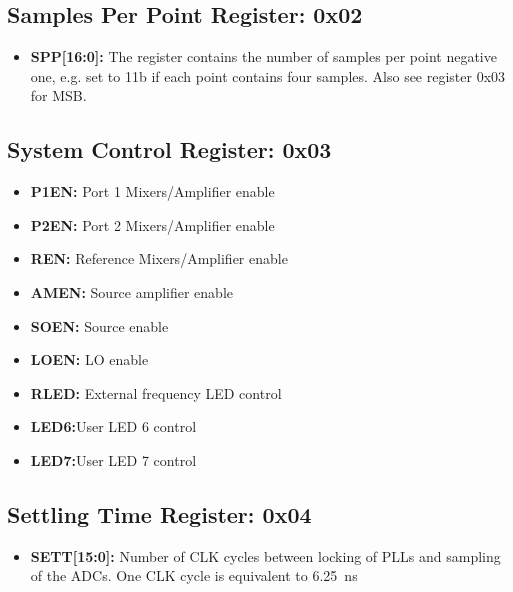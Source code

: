 \documentclass{article}
\newcommand{\bitrect}[2]{
  \begin{pgfonlayer}{foreground}
    \draw [thick] (0,0) rectangle (#1,1);
    \pgfmathsetmacro\result{#1-1}
    \foreach \x in {1,...,\result}
      \draw [thick] (\x,1) -- (\x, 0.8);
  \end{pgfonlayer}
  \bitlabels{#1}{#2}
}
\newcommand{\rwbits}[3]{
  \draw [thick] (#1,0) rectangle ++(#2,1) node[pos=0.5]{#3};
  \pgfmathsetmacro\start{#1+0.5}
  \pgfmathsetmacro\finish{#1+#2-0.5}
}
\newcommand{\robits}[3]{
  \begin{pgfonlayer}{background}
    \draw [thick, fill=lightgray] (#1,0) rectangle ++(#2,1) node[pos=0.5]{#3};
  \end{pgfonlayer}
  \pgfmathsetmacro\start{#1+0.5}
  \pgfmathsetmacro\finish{#1+#2-0.5}
}
\newcommand{\bitlabels}[2]{
  \foreach \bit in {1,...,#1}{
     \pgfmathsetmacro\result{#2}
     \node [above] at (\bit-0.5, 1) {\pgfmathprintnumber{\result}};
   }
}
\begin{document}
\subsection{Samples Per Point Register: 0x02}
\begin{center}
\end{center}
\begin{itemize}
\item \textbf{SPP[16:0]:} The register contains the number of samples per point negative one, e.g. set to 11b if each point contains four samples. Also see register 0x03 for MSB.
\end{itemize}

\subsection{System Control Register: 0x03}
\begin{center}
\end{center}
\begin{itemize}
\item \textbf{P1EN:} Port 1 Mixers/Amplifier enable
\item \textbf{P2EN:} Port 2 Mixers/Amplifier enable
\item \textbf{REN:} Reference Mixers/Amplifier enable
\item \textbf{AMEN:} Source amplifier enable
\item \textbf{SOEN:} Source enable
\item \textbf{LOEN:} LO enable
\item \textbf{RLED:} External frequency LED control
\item \textbf{LED6:}{User LED 6 control}
\item \textbf{LED7:}{User LED 7 control}
\end{itemize}

\subsection{Settling Time Register: 0x04}
\begin{center}
\end{center}
\begin{itemize}
\item \textbf{SETT[15:0]:} Number of CLK cycles between locking of PLLs and sampling of the ADCs. One CLK cycle is equivalent to \SI{6.25}{\nano\second}
\end{itemize}
\end{document}
